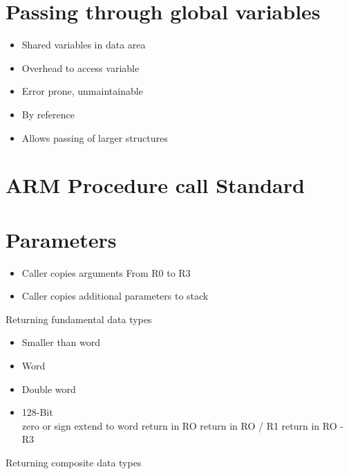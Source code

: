 \documentclass[10pt]{article}
\begin{document}
\section*{Passing through global variables}
\begin{itemize}
  \item Shared variables in data area
  \item Overhead to access variable
  \item Error prone, unmaintainable
  \item By reference
  \item Allows passing of larger structures
\end{itemize}

\section*{ARM Procedure call Standard}
\section*{Parameters}
\begin{itemize}
  \item Caller copies arguments From R0 to R3
  \item Caller copies additional parameters to stack
\end{itemize}

Returning fundamental data types

\begin{itemize}
  \item Smaller than word
  \item Word
  \item Double word
  \item 128-Bit\\
zero or sign extend to word return in RO return in RO / R1 return in RO - R3
\end{itemize}

Returning composite data types
\end{document}
